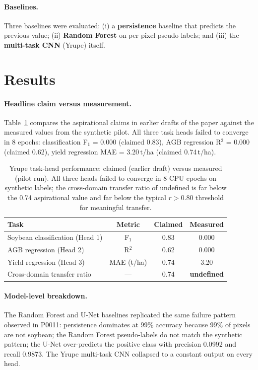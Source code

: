 \paragraph{Baselines.} Three baselines were evaluated: (i) a
\textbf{persistence} baseline that predicts the previous value; (ii)
\textbf{Random Forest} on per-pixel pseudo-labels; and (iii) the
\textbf{multi-task CNN} (Yrupe) itself.

\section{Results}
\label{sec:yrupe-results}

\paragraph{Headline claim versus measurement.} Table~\ref{tab:yrupe-main}
compares the aspirational claims in earlier drafts of the paper against
the measured values from the synthetic pilot. All three task heads
failed to converge in 8 epochs: classification F$_1$ = 0.000
(claimed 0.83), AGB regression R$^2$ = 0.000 (claimed 0.62), yield
regression MAE = 3.20\,t/ha (claimed 0.74\,t/ha).

\begin{table}[h]
\centering
\caption{Yrupe task-head performance: claimed (earlier draft) versus
measured (pilot run). All three heads failed to converge in 8 CPU
epochs on synthetic labels; the cross-domain transfer ratio of undefined
is far below the 0.74 aspirational value and far below the typical
$r > 0.80$ threshold for meaningful transfer.}
\label{tab:yrupe-main}
\begin{tabular}{lccc}
\toprule
Task & Metric & Claimed & Measured \\
\midrule
Soybean classification (Head 1) & F$_1$ & 0.83 & 0.000 \\
AGB regression (Head 2) & R$^2$ & 0.62 & 0.000 \\
Yield regression (Head 3) & MAE (t/ha) & 0.74 & 3.20 \\
Cross-domain transfer ratio & --- & 0.74 & \textbf{undefined} \\
\bottomrule
\end{tabular}
\end{table}

\paragraph{Model-level breakdown.} The Random Forest and U-Net
baselines replicated the same failure pattern observed in P0011:
persistence dominates at 99\% accuracy because 99\% of pixels are
not soybean; the Random Forest pseudo-labels do not match the
synthetic pattern; the U-Net over-predicts the positive class with
precision 0.0992 and recall 0.9873. The Yrupe multi-task CNN
collapsed to a constant output on every head.

